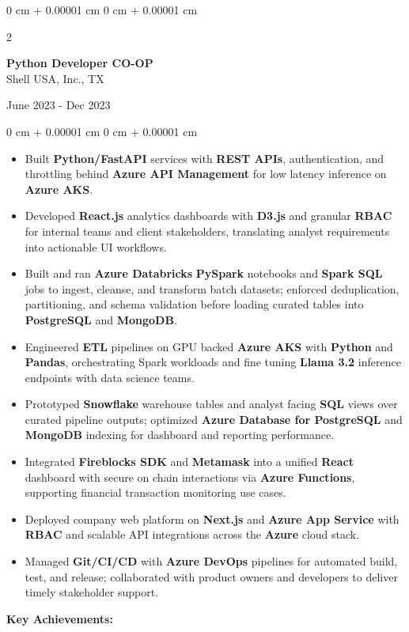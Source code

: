 \documentclass[10pt, letterpaper]{article}
\newenvironment{highlights}{
    \begin{itemize}[
        topsep=0.10 cm,
        parsep=0.10 cm,
        partopsep=0pt,
        itemsep=0pt,
        leftmargin=0 cm + 10pt
    ]
}{
    \end{itemize}
} %
\newenvironment{onecolentry}{
    \begin{adjustwidth}{
        0 cm + 0.00001 cm
    }{
        0 cm + 0.00001 cm
    }
}{
    \end{adjustwidth}
} %
\newenvironment{twocolentry}[2][]{
    \onecolentry
    \def\secondColumn{#2}
    \setcolumnwidth{\fill, 4.5 cm}
    \begin{paracol}{2}
}{
    \switchcolumn \raggedleft \secondColumn
    \end{paracol}
    \endonecolentry
} %
\begin{document}
\vspace{0.15 cm}
\begin{twocolentry}{
	June 2023 - Dec 2023
}
\textbf{Python Developer CO-OP}\\
Shell USA, Inc., TX
\end{twocolentry}

\begin{onecolentry}
\begin{highlights}
	\item Built \textbf{Python/FastAPI} services with \textbf{REST APIs}, authentication, and throttling behind \textbf{Azure API Management} for low latency inference on \textbf{Azure AKS}.
	\item Developed \textbf{React.js} analytics dashboards with \textbf{D3.js} and granular \textbf{RBAC} for internal teams and client stakeholders, translating analyst requirements into actionable UI workflows.
	\item Built and ran \textbf{Azure Databricks} \textbf{PySpark} notebooks and \textbf{Spark SQL} jobs to ingest, cleanse, and transform batch datasets; enforced deduplication, partitioning, and schema validation before loading curated tables into \textbf{PostgreSQL} and \textbf{MongoDB}.
	\item Engineered \textbf{ETL} pipelines on GPU backed \textbf{Azure AKS} with \textbf{Python} and \textbf{Pandas}, orchestrating Spark workloads and fine tuning \textbf{Llama 3.2} inference endpoints with data science teams.
	\item Prototyped \textbf{Snowflake} warehouse tables and analyst facing \textbf{SQL} views over curated pipeline outputs; optimized \textbf{Azure Database for PostgreSQL} and \textbf{MongoDB} indexing for dashboard and reporting performance.
	\item Integrated \textbf{Fireblocks SDK} and \textbf{Metamask} into a unified \textbf{React} dashboard with secure on chain interactions via \textbf{Azure Functions}, supporting financial transaction monitoring use cases.
	\item Deployed company web platform on \textbf{Next.js} and \textbf{Azure App Service} with \textbf{RBAC} and scalable API integrations across the \textbf{Azure} cloud stack.
	\item Managed \textbf{Git/CI/CD} with \textbf{Azure DevOps} pipelines for automated build, test, and release; collaborated with product owners and developers to deliver timely stakeholder support.
\end{highlights}
\textbf{Key Achievements:}

\end{onecolentry}
\end{document}
